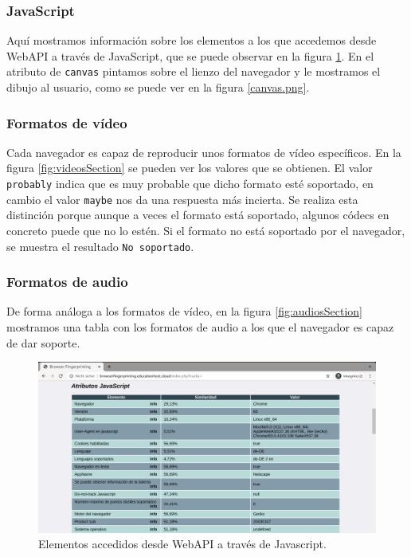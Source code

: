\subsubsection{JavaScript}
Aquí mostramos información sobre los elementos a los que accedemos desde WebAPI a través de JavaScript, que se puede observar en la figura \ref{fig:javaScriptSection.png}. En el atributo de \texttt{canvas} pintamos sobre el lienzo del navegador y le mostramos el dibujo al usuario, como se puede ver en la figura \ref{canvas.png}.

\subsubsection{Formatos de vídeo}
Cada navegador es capaz de reproducir unos formatos de vídeo específicos. En la figura \ref{fig:videosSection} se pueden ver los valores que se obtienen. El valor \texttt{probably} indica que es muy probable que dicho formato esté soportado, en cambio el valor \texttt{maybe} nos da una respuesta más incierta. Se realiza esta distinción porque aunque a veces el formato está soportado, algunos códecs en concreto puede que no lo estén. Si el formato no está soportado por el navegador, se muestra el resultado \texttt{No soportado}.

\subsubsection{Formatos de audio}
De forma análoga a los formatos de vídeo, en la figura \ref{fig:audiosSection} mostramos una tabla con los formatos de audio a los que el navegador es capaz de dar soporte.

\begin{figure}[tbp]
	\centering
	\includegraphics[width=1\textwidth]{Images/javaScriptSection.png}
	\caption{Elementos accedidos desde WebAPI a través de Javascript.}
	\label{fig:javaScriptSection.png}
\end{figure}

